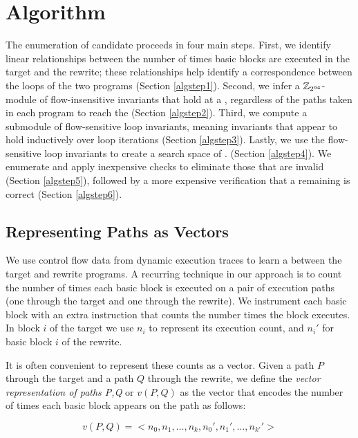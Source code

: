 \section{Algorithm}


The enumeration of candidate \bisimreps{} proceeds in four main steps.
First, we identify linear relationships between the number of times
basic blocks are executed in the target and the rewrite; these
relationships help identify a correspondence between the loops
of the two programs (Section \ref{algstep1}). Second, we infer
a $\mathbb{Z}_{2^{64}}$-module of flow-insensitive invariants that hold at a
\cutpoint, regardless of the paths taken in each program to reach the
\cutpoint{} (Section \ref{algstep2}). Third, we compute a submodule
of flow-sensitive loop invariants, meaning invariants that appear
to hold inductively over loop iterations (Section \ref{algstep3}).
Lastly, we use the flow-sensitive loop invariants to create a search
space of \bisimreps. (Section \ref{algstep4}). We enumerate \bisimreps and
apply inexpensive checks to eliminate those that are invalid (Section
\ref{algstep5}), followed by a more expensive verification that a
remaining \bisimrep{} is correct (Section \ref{algstep6}).

\subsection{Representing Paths as Vectors}

We use control flow data from dynamic execution traces to learn
a \bisim{} between the target and rewrite programs. A recurring
technique in our approach is to count the number of times each basic
block is executed on a pair of execution paths (one through the target
and one through the rewrite). We instrument each basic block with an
extra instruction that counts the number times the block executes.
In block $i$ of the target we use \shadow{} $n_i$ to represent its
execution count, and $n_i'$ for basic block $i$ of the rewrite.

It is often convenient to represent these counts as a vector. Given
a path $P$ through the target and a path $Q$ through the rewrite, we
define the \emph{vector representation of paths P,Q} or $v(P,Q)$ as
the vector that encodes the number of times each basic block appears
on the path as follows:

$$v(P,Q) = <n_0, n_1, \dotsc, n_k, n_0', n_1', \dotsc, n_{k'}'>$$

